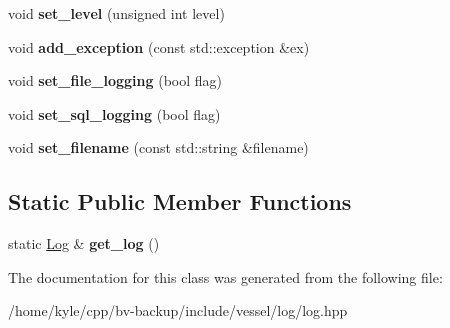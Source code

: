 \begin{DoxyCompactItemize}
void {\bfseries set\+\_\+level} (unsigned int level)
\item 
\mbox{\label{class_vessel_1_1_logging_1_1_log_a405aea446f8a5e435f2ad42937b5b692}} 
void {\bfseries add\+\_\+exception} (const std\+::exception \&ex)
\item 
\mbox{\label{class_vessel_1_1_logging_1_1_log_a07f5bdf65c8486bbc0435ec2aea89268}} 
void {\bfseries set\+\_\+file\+\_\+logging} (bool flag)
\item 
\mbox{\label{class_vessel_1_1_logging_1_1_log_abe368762856fa1a3d35d42d2fdf58127}} 
void {\bfseries set\+\_\+sql\+\_\+logging} (bool flag)
\item 
\mbox{\label{class_vessel_1_1_logging_1_1_log_a7b042407715512a34df83180594f28d0}} 
void {\bfseries set\+\_\+filename} (const std\+::string \&filename)
\end{DoxyCompactItemize}
\subsection*{Static Public Member Functions}
\begin{DoxyCompactItemize}
\item 
\mbox{\label{class_vessel_1_1_logging_1_1_log_a58190201c41f0a3bb4ce7a5058abf949}} 
static \hyperlink{class_vessel_1_1_logging_1_1_log}{Log} \& {\bfseries get\+\_\+log} ()
\end{DoxyCompactItemize}


The documentation for this class was generated from the following file\+:\begin{DoxyCompactItemize}
\item 
/home/kyle/cpp/bv-\/backup/include/vessel/log/log.\+hpp\end{DoxyCompactItemize}
